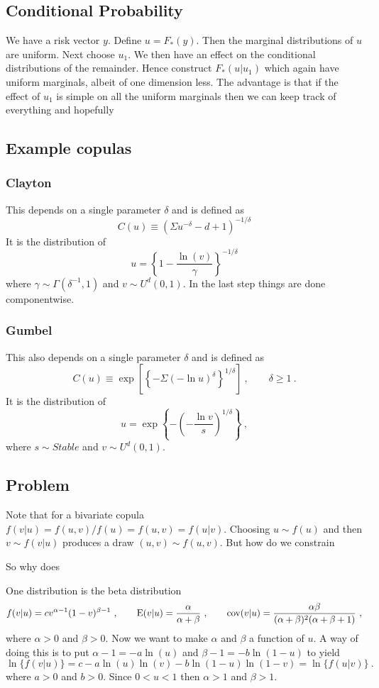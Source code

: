 \documentclass[a4paper,12pt]{article}
\newcommand{\cov}{{\rm cov}}
\newcommand{\E}{{\mathrm E}}
\begin{document}
\subsection*{Conditional Probability}

We have a risk vector $y$.   Define $u=F_*(y)$.   Then the marginal distributions of $u$ are uniform.   Next choose $u_1$.   We then have an effect on the conditional distributions of the remainder.   Hence construct $F_*(u|u_1)$ which again have uniform marginals, albeit of one dimension less.   The advantage is that if the effect of $u_1$ is simple on all the uniform marginals then we can keep track of everything and hopefully

\subsection*{Example copulas}

\subsubsection{Clayton} This depends on a single parameter $\delta$  and is defined as
$$
C(u)\equiv\left(\Sigma u^{-\delta}-d+1\right)^{-1/\delta}
$$
It is the distribution of
$$
u=\left\{1-\frac{\ln(v)}{\gamma}\right\}^{-1/\delta}
$$
where $\gamma \sim \Gamma(\delta^{-1},1)$ and $v\sim U^d(0,1)$.
In the last step things are done componentwise.

\subsubsection{Gumbel}
This also depends on a single parameter $\delta$ and is defined as
$$
C(u)\equiv  \exp\left[\left\{-\Sigma (-\ln u)^{\delta}\right\}^{1/\delta}\right]\ , \qquad \delta\ge 1\ .
$$
It is the distribution of
$$
u= \exp\left\{- \left(-\frac{\ln v}{s}\right)^{1/\delta}\right\}\ ,
$$
where $s\sim Stable$ and $v\sim U^d(0,1)$.

\subsection*{Problem}

Note that for a bivariate copula $f(v|u)=f(u,v)/f(u)=f(u,v)=f(u|v)$.  Choosing $u\sim f(u)$ and then $v\sim f(v|u)$ produces a draw $(u,v)\sim f(u,v)$.  But how do we constrain



So why does

One distribution is the beta distribution
$$
    f(v|u)=cv^{\alpha-1}(1-v)^{\beta-1}\ , \qquad \E(v|u)=\frac{\alpha}{\alpha+\beta}\ , \qquad \cov(v|u)=\frac{\alpha\beta}{(\alpha+\beta)^2(\alpha+\beta+1)}\ ,
$$
where $\alpha>0$ and $\beta>0$.  Now we want to make $\alpha$ and $\beta$ a function of $u$.  A way of doing this is to put $\alpha-1=-a\ln(u)$ and $\beta-1=-b\ln(1-u)$ to yield
$$
\ln\{f(v|u)\}=c-a\ln(u)\ln(v)-b\ln(1-u)\ln(1-v)=\ln\{f(u|v)\}\ .
$$
where $a>0$ and $b>0$.  Since $0<u<1$  then $\alpha>1$ and $\beta>1$.
\end{document}
